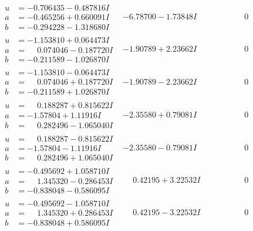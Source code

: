 \documentclass[1p]{elsarticle_modified}
\theoremstyle{definition}
\begin{document}
$$\begin{array}{c|c|c}
\begin{aligned}
u &= -0.706435 - 0.487816 I \\
a &= -0.465256 + 0.660091 I \\
b &= -0.294228 - 1.318680 I\end{aligned}
 & -6.78700 - 1.73848 I & \phantom{-0.000000 } 0 \\ \hline\begin{aligned}
u &= -1.153810 + 0.064473 I \\
a &= \phantom{-}0.074046 - 0.187720 I \\
b &= -0.211589 - 1.026870 I\end{aligned}
 & -1.90789 + 2.23662 I & \phantom{-0.000000 } 0 \\ \hline\begin{aligned}
u &= -1.153810 - 0.064473 I \\
a &= \phantom{-}0.074046 + 0.187720 I \\
b &= -0.211589 + 1.026870 I\end{aligned}
 & -1.90789 - 2.23662 I & \phantom{-0.000000 } 0 \\ \hline\begin{aligned}
u &= \phantom{-}0.188287 + 0.815622 I \\
a &= -1.57804 + 1.11916 I \\
b &= \phantom{-}0.282496 - 1.065040 I\end{aligned}
 & -2.35580 + 0.79081 I & \phantom{-0.000000 } 0 \\ \hline\begin{aligned}
u &= \phantom{-}0.188287 - 0.815622 I \\
a &= -1.57804 - 1.11916 I \\
b &= \phantom{-}0.282496 + 1.065040 I\end{aligned}
 & -2.35580 - 0.79081 I & \phantom{-0.000000 } 0 \\ \hline\begin{aligned}
u &= -0.495692 + 1.058710 I \\
a &= \phantom{-}1.345320 - 0.286453 I \\
b &= -0.838048 - 0.586095 I\end{aligned}
 & \phantom{-}0.42195 + 3.22532 I & \phantom{-0.000000 } 0 \\ \hline\begin{aligned}
u &= -0.495692 - 1.058710 I \\
a &= \phantom{-}1.345320 + 0.286453 I \\
b &= -0.838048 + 0.586095 I\end{aligned}
 & \phantom{-}0.42195 - 3.22532 I & \phantom{-0.000000 } 0 \\ \hline\begin{aligned}

\end{aligned}
\end{array}$$
\end{document}

